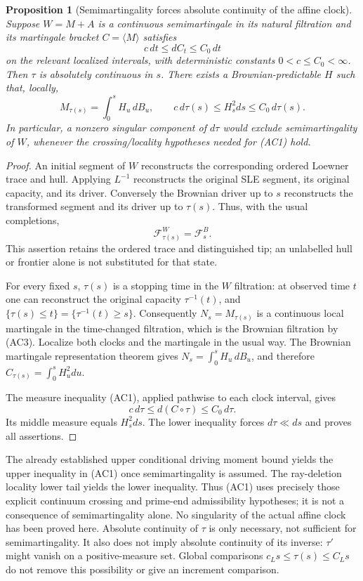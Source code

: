 \documentclass[11pt]{article}
\newtheorem{proposition}[theorem]{Proposition}
\theoremstyle{definition}\newtheorem{definition}[theorem]{Definition}
\theoremstyle{remark}\newtheorem{remark}[theorem]{Remark}
\begin{document}
\begin{proposition}[Semimartingality forces absolute continuity of the affine clock]
\label{prop:affine-clock-ac-necessary}
Suppose $W=M+A$ is a continuous semimartingale in its natural
filtration and its martingale bracket $C=\langle M\rangle$ satisfies
\[
 c\,dt\le dC_t\le C_0\,dt
 \tag{AC1}
\]
on the relevant localized intervals, with deterministic constants
$0<c\le C_0<\infty$. Then $\tau$ is absolutely continuous in $s$.
There exists a Brownian-predictable $H$ such that, locally,
\[
 M_{\tau(s)}=\int_0^s H_u\,dB_u,
 \qquad
 c\,d\tau(s)\le H_s^2ds\le C_0\,d\tau(s).
 \tag{AC2}
\]
In particular, a nonzero singular component of $d\tau$ would exclude
semimartingality of $W$, whenever the crossing/locality hypotheses
needed for (AC1) hold.
\end{proposition}
\begin{proof}
An initial segment of $W$ reconstructs the corresponding ordered
Loewner trace and hull. Applying $L^{-1}$ reconstructs the original
SLE segment, its original capacity, and its driver. Conversely the
Brownian driver up to $s$ reconstructs the transformed segment and
its driver up to $\tau(s)$. Thus, with the usual completions,
\[
 \mathcal F^W_{\tau(s)}=\mathcal F^B_s.
 \tag{AC3}
\]
This assertion retains the ordered trace and distinguished tip; an
unlabelled hull or frontier alone is not substituted for that state.

For every fixed $s$, $\tau(s)$ is a stopping time in the $W$
filtration: at observed time $t$ one can reconstruct the original
capacity $\tau^{-1}(t)$, and
$\{\tau(s)\le t\}=\{\tau^{-1}(t)\ge s\}$.
Consequently $N_s=M_{\tau(s)}$ is a continuous local martingale
in the time-changed filtration, which is the Brownian filtration
by (AC3). Localize both clocks and the martingale in the usual way.
The Brownian martingale representation theorem gives
$N_s=\int_0^sH_u\,dB_u$, and therefore
$C_{\tau(s)}=\int_0^sH_u^2du$.

The measure inequality (AC1), applied pathwise to each clock interval,
gives
\[
 c\,d\tau\le d(C\circ\tau)\le C_0\,d\tau.
\]
Its middle measure equals $H_s^2ds$. The lower inequality forces
$d\tau\ll ds$ and proves all assertions.
\end{proof}

The already established upper conditional driving moment bound yields
the upper inequality in (AC1) once semimartingality is assumed.
The ray-deletion locality lower tail yields the lower inequality.
Thus (AC1) uses precisely those explicit continuum crossing and
prime-end admissibility hypotheses; it is not a consequence of
semimartingality alone. No singularity of the actual affine clock has
been proved here. Absolute continuity of $\tau$ is only necessary,
not sufficient for semimartingality. It also does not imply absolute
continuity of its inverse: $\tau'$ might vanish on a positive-measure
set. Global comparisons $c_Ls\le\tau(s)\le C_Ls$ do not remove this
possibility or give an increment comparison.
\end{document}
